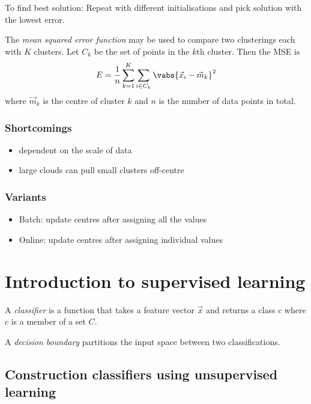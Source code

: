 \documentclass{article}
\begin{document}
To find best solution: Repeat with different initialisations and pick solution
with the lowest error.
\begin{definition}
	The \emph{mean squared error function} may be used to compare two clusterings
	each with $K$ clusters. Let $C_k$ be the set of points in the $k$th cluster.
	Then the MSE is
	\begin{align*}
		E = \frac{1}{n}\sum_{k=1}^K \sum_{i\in C_k} \vabs{\vec x_i - \vec m_k}^2
	\end{align*}
	where $\vec m_k$ is the centre of cluster $k$ and $n$ is the number of data
	points in total.
\end{definition}

\subsubsection{Shortcomings}

\begin{itemize}
	\item dependent on the scale of data
	\item large clouds can pull small clusters off-centre
\end{itemize}

\subsubsection{Variants}

\begin{itemize}
	\item Batch: update centres after assigning all the values
	\item Online: update centres after assigning individual values 
\end{itemize}


\section{Introduction to supervised learning}


\begin{definition}
	A \emph{classifier} is a function that takes a feature vector $\vec x$
	and returns a class $c$ where $c$ is a member of a set $C$.
\end{definition}
\begin{definition}
	A \emph{decision boundary} partitions the input space between two
	classifications.
\end{definition}

\subsection{Construction classifiers using unsupervised learning}
\end{document}
